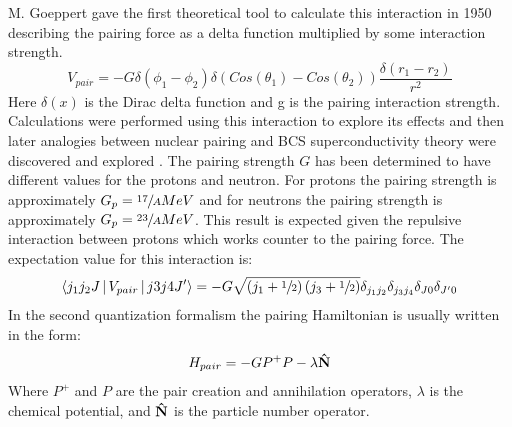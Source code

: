 M. Goeppert gave the first theoretical tool to calculate this interaction in 1950 \cite{pairingFirstTheory} describing the pairing force as a delta function multiplied by some interaction strength.
\begin{equation}
\label{eqn:chp2-pairing-first-function}
V_{pair}=-G\delta(\phi_1-\phi_2)\delta(Cos(\theta_1)-Cos(\theta_2))\frac{\delta(r_1-r_2)}{r^2}
\end{equation}
Here $\delta(x)$ is the Dirac delta function and g is the pairing interaction strength. Calculations were performed using this interaction to explore its effects \cite{pairingCorrEffectOnProperties} and then later analogies between nuclear pairing and BCS superconductivity theory were discovered and explored \cite{pairingAnalogyToBCS,pairingSuperfluidity,bcsTheory}. The pairing strength $G$ has been determined to have different values for the protons and neutron. For protons the pairing strength is approximately $G_p=\sfrac{17}{A} MeV$ and for neutrons the pairing strength is approximately $G_p=\sfrac{23}{A} MeV$. This result is expected given the repulsive interaction between protons which works counter to the pairing force. The expectation value for this interaction is:
\begin{equation}
\label{eqn:chp2-pairing-expectation}
\Braket{j_1j_2J|V_{pair}|j3j4J'}=-G\sqrt{\left(j_1+\sfrac{1}{2}\right)\left(j_3+\sfrac{1}{2}\right)}\delta_{j_1j_2}\delta_{j_3j_4}\delta_{J0}\delta_{J'0}
\end{equation}
In the second quantization formalism the pairing Hamiltonian is usually written in the form:
\begin{equation}
\label{eqn:chp2-pairing-hamil}
H_{pair} = -GP^+P-\lambda{}\boldsymbol{\hat{\textbf{N}}}
\end{equation}
Where $P^+$ and $P$ are the pair creation and annihilation operators, $\lambda$ is the chemical potential, and $\boldsymbol{\hat{\textbf{N}}}$ is the particle number operator.

